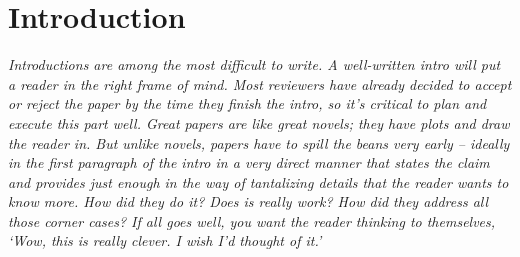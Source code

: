 \section{Introduction}
\label{sec:intro}

{\em Introductions are among the most difficult to write.  A
  well-written intro will put a reader in the right frame of mind.
  Most reviewers have already decided to accept or reject the paper by
  the time they finish the intro, so it's critical to plan and execute
  this part well.  Great papers are like great novels; they have plots
  and draw the reader in.  But unlike novels, papers have to spill the
  beans very early -- ideally in the first paragraph of the intro in a
  very direct manner that states the claim and provides just enough in
  the way of tantalizing details that the reader wants to know more.
  How did they do it?  Does is really work?  How did they address all
  those corner cases?  If all goes well, you want the reader thinking
  to themselves, `Wow, this is really clever.  I wish I'd thought of
  it.'}

\glipsum[1-4]
